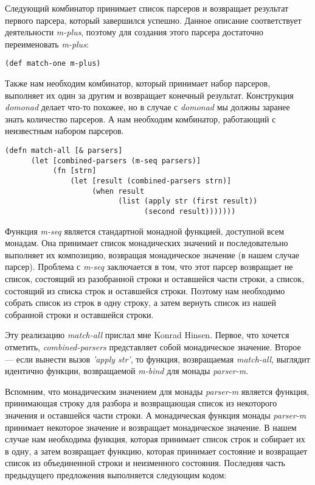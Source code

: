 \documentclass[a4paper,12pt]{article}
\newcommand{\cl}[1] {{\it #1}}
\begin{document}
Следующий комбинатор принимает список парсеров и возвращает результат первого парсера, который
завершился успешно. Данное описание соответствует деятельности \cl{m-plus}, поэтому для создания этого
парсера достаточно переименовать \cl{m-plus}:

\begin{verbatim}
(def match-one m-plus)
\end{verbatim}

Также нам необходим комбинатор, который принимает набор парсеров, выполняет их один за другим
и возвращает конечный результат. Конструкция \cl{domonad} делает что-то похожее, но в случае с \cl{domonad}
мы должны заранее знать количество парсеров. А нам необходим комбинатор, работающий с неизвестным
набором парсеров. 

\begin{verbatim}
(defn match-all [& parsers]
      (let [combined-parsers (m-seq parsers)]
           (fn [strn]
               (let [result (combined-parsers strn)]
                    (when result
                          (list (apply str (first result))
                                (second result)))))))
\end{verbatim}

Функция \cl{m-seq} является стандартной монадной функцией, доступной всем монадам. Она принимает 
список монадических значений и последовательно выполняет их композицию, возвращая монадическое
значение (в нашем случае парсер). Проблема с \cl{m-seq} заключается в том, что этот парсер возвращает
не список, состоящий из разобранной строки и оставшейся части строки, а список, состоящий 
из списка строк и оставшейся строки. Поэтому нам необходимо собрать список из строк в одну строку,
а затем вернуть список из нашей собранной строки и оставшейся строки. 

Эту реализацию \cl{match-all} прислал мне Konrad Hinsen. Первое, что хочется отметить, \cl{combined-parsers} 
представляет собой монадическое значение. Второе --- если вынести вызов \cl{'apply str'}, то функция, 
возвращаемая \cl{match-all}, выглядит идентично функции, возвращаемой \cl{m-bind} для монады \cl{parser-m}. 

Вспомним, что монадическим значением для монады \cl{parser-m} является функция, принимающая строку
для разбора и возвращающая список из некоторого значения и оставшейся части строки. А монадическая
функция монады \cl{parser-m} принимает некоторое значение и возвращает монадическое значение. В нашем
случае нам необходима функция, которая принимает список строк и собирает их в одну, а затем
возвращает функцию, которая принимает состояние и возвращает список из объединенной строки 
и неизменного состояния. Последняя часть предыдущего предложения выполняется следующим кодом:
\end{document}
